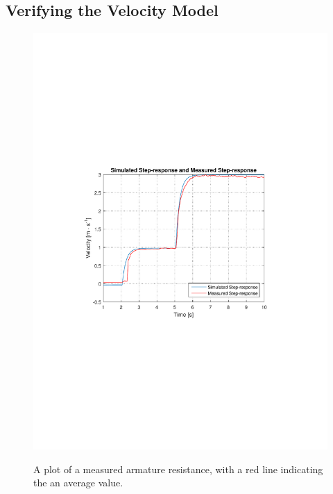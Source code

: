 \subsection{Verifying the Velocity Model}


\begin{figure}[H]
  \centering
  {
    \includegraphics[width=1.2\textwidth]{figures/SimulationIRLsteprespons2.pdf}
  }
  \caption{A plot of a measured armature resistance, with a red line indicating the an average value.}
  \label{armatureResistance}
\end{figure}

